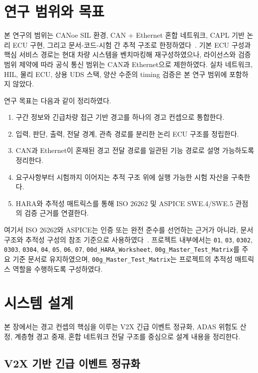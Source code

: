 \documentclass[11pt,a4paper]{article}
\begin{document}
\section{연구 범위와 목표}

본 연구의 범위는 CANoe SIL 환경, CAN + Ethernet 혼합 네트워크, CAPL 기반 논리 ECU 구현, 그리고 문서-코드-시험 간 추적 구조로 한정하였다~\cite{canoe}. 기본 ECU 구성과 핵심 서비스 경로는 현대 차량 시스템을 벤치마킹해 재구성하였으나, 라이선스와 검증 범위 제약에 따라 공식 통신 범위는 CAN과 Ethernet으로 제한하였다. 실차 네트워크, HIL, 물리 ECU, 상용 UDS 스택, 양산 수준의 timing 검증은 본 연구 범위에 포함하지 않았다.

연구 목표는 다음과 같이 정리하였다.

\begin{enumerate}[label=\arabic*.]
\item 구간 정보와 긴급차량 접근 기반 경고를 하나의 경고 컨셉으로 통합한다.
\item 입력, 판단, 출력, 전달 경계, 관측 경로를 분리한 논리 ECU 구조를 정립한다.
\item CAN과 Ethernet이 혼재된 경고 전달 경로를 일관된 기능 경로로 설명 가능하도록 정리한다.
\item 요구사항부터 시험까지 이어지는 추적 구조 위에 실행 가능한 시험 자산을 구축한다.
\item HARA와 추적성 매트릭스를 통해 ISO 26262 및 ASPICE SWE.4/SWE.5 관점의 검증 근거를 연결한다.
\end{enumerate}

여기서 ISO 26262와 ASPICE는 인증 또는 완전 준수를 선언하는 근거가 아니라, 문서 구조와 추적성 구성의 참조 기준으로 사용하였다~\cite{iso26262,aspice_spice,aspice_training}. 프로젝트 내부에서는 \texttt{01}, \texttt{03}, \texttt{0302}, \texttt{0303}, \texttt{0304}, \texttt{04}, \texttt{05}, \texttt{06}, \texttt{07}, \texttt{00d\_HARA\_Worksheet}, \texttt{00g\_Master\_Test\_Matrix}를 주요 기준 문서로 유지하였으며, \texttt{00g\_Master\_Test\_Matrix}는 프로젝트의 추적성 매트릭스 역할을 수행하도록 구성하였다.

\section{시스템 설계}

본 장에서는 경고 컨셉의 핵심을 이루는 V2X 긴급 이벤트 정규화, ADAS 위험도 산정, 계층형 경고 중재, 혼합 네트워크 전달 구조를 중심으로 설계 내용을 정리한다.

\subsection{V2X 기반 긴급 이벤트 정규화}
\end{document}
